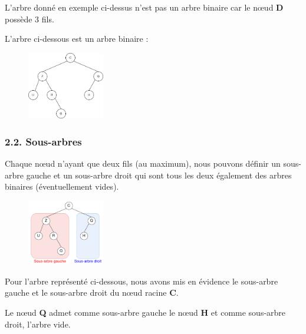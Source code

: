 \documentclass[
  a4paper,
  DIV=11,
  numbers=noendperiod]{scrartcl}
\begin{document}
L'arbre donné en exemple ci-dessus n'est pas un arbre binaire car le
nœud \textbf{D} possède 3 fils.

L'arbre ci-dessous est un arbre binaire :

\begin{figure}

{\centering \includegraphics[width=0.3\textwidth,height=\textheight]{arbre_bin.png}

}

\end{figure}

\hypertarget{sous-arbres}{%
\subsubsection{2.2. Sous-arbres}\label{sous-arbres}}

Chaque nœud n'ayant que deux fils (au maximum), nous pouvons définir un
sous-arbre gauche et un sous-arbre droit qui sont tous les deux
également des arbres binaires (éventuellement vides).

\begin{figure}

{\centering \includegraphics[width=0.3\textwidth,height=\textheight]{arbre_bin2.png}

}

\end{figure}

\begin{tcolorbox}[enhanced jigsaw, opacitybacktitle=0.6, title=\textcolor{quarto-callout-caution-color}{\faFire}\hspace{0.5em}{Exemple}, coltitle=black, left=2mm, breakable, opacityback=0, bottomtitle=1mm, colback=white, leftrule=.75mm, rightrule=.15mm, bottomrule=.15mm, titlerule=0mm, arc=.35mm, colbacktitle=quarto-callout-caution-color!10!white, toprule=.15mm, toptitle=1mm]

Pour l'arbre représenté ci-dessous, nous avons mis en évidence le
sous-arbre gauche et le sous-arbre droit du nœud racine \textbf{C}.

Le nœud \textbf{Q} admet comme sous-arbre gauche le nœud \textbf{H} et
comme sous-arbre droit, l'arbre vide.

\end{tcolorbox}
\end{document}
